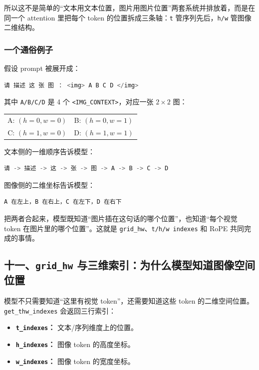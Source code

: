 所以这不是简单的“文本用文本位置，图片用图片位置”两套系统并排放着，而是在同一个 attention 里把每个 token 的位置拆成三条轴：\texttt{t} 管序列先后，\texttt{h/w} 管图像二维结构。

\subsubsection{一个通俗例子}

假设 prompt 被展开成：

\begin{lstlisting}[language=Python]
请 描述 这 张 图 ： <img> A B C D </img>
\end{lstlisting}

其中 \texttt{A/B/C/D} 是 4 个 \texttt{<IMG\_CONTEXT>}，对应一张 \(2 \times 2\) 图：

\begin{center}
\begin{tabular}{cc}
A: $(h=0,w=0)$ & B: $(h=0,w=1)$ \\
C: $(h=1,w=0)$ & D: $(h=1,w=1)$
\end{tabular}
\end{center}

文本侧的一维顺序告诉模型：

\begin{lstlisting}[language=Python]
请 -> 描述 -> 这 -> 张 -> 图 -> A -> B -> C -> D
\end{lstlisting}

图像侧的二维坐标告诉模型：

\begin{lstlisting}[language=Python]
A 在左上，B 在右上，C 在左下，D 在右下
\end{lstlisting}

把两者合起来，模型既知道“图片插在这句话的哪个位置”，也知道“每个视觉 token 在图片里的哪个位置”。这就是 \texttt{grid\_hw}、\texttt{t/h/w indexes} 和 RoPE 共同完成的事情。

\subsection{十一、\texttt{grid\_hw} 与三维索引：为什么模型知道图像空间位置}

模型不只需要知道“这里有视觉 token”，还需要知道这些 token 的二维空间位置。\texttt{get\_thw\_indexes} 会返回三行索引：

\begin{itemize}[leftmargin=1.5em]
  \item \textbf{\texttt{t\_indexes}：} 文本/序列维度上的位置。
  \item \textbf{\texttt{h\_indexes}：} 图像 token 的高度坐标。
  \item \textbf{\texttt{w\_indexes}：} 图像 token 的宽度坐标。
\end{itemize}

